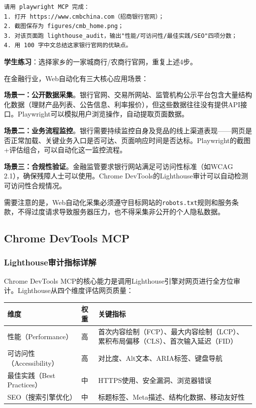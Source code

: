 \begin{lstlisting}
请用 playwright MCP 完成：
1. 打开 https://www.cmbchina.com（招商银行官网）；
2. 截图保存为 figures/cmb_home.png；
3. 对该页面跑 lighthouse_audit，输出"性能/可访问性/最佳实践/SEO"四项分数；
4. 用 100 字中文总结这家银行官网的优缺点。
\end{lstlisting}

\textbf{学生练习}：选择家乡的一家城商行/农商行官网，重复上述4步。

\begin{theorybox}[Web自动化在金融数据采集中的应用场景]
在金融行业，Web自动化有三大核心应用场景：

\textbf{场景一：公开数据采集}。银行官网、交易所网站、监管机构公示平台包含大量结构化数据（理财产品列表、公告信息、利率报价），但这些数据往往没有提供API接口。Playwright可以模拟用户浏览操作，自动提取页面数据。

\textbf{场景二：业务流程监控}。银行需要持续监控自身及竞品的线上渠道表现——网页是否正常加载、关键业务入口是否可达、页面响应时间是否达标。Playwright的截图+评估组合，可以自动化这一监控流程。

\textbf{场景三：合规性验证}。金融监管要求银行网站满足可访问性标准（如WCAG 2.1），确保残障人士可以使用。Chrome DevTools的Lighthouse审计可以自动检测可访问性合规情况。

需要注意的是，Web自动化采集必须遵守目标网站的\texttt{robots.txt}规则和服务条款，不得过度请求导致服务器压力，也不得采集非公开的个人隐私数据。
\end{theorybox}

\subsection{Chrome DevTools MCP}

\subsubsection{Lighthouse审计指标详解}

Chrome DevTools MCP的核心能力是调用Lighthouse引擎对网页进行全方位审计。Lighthouse从四个维度评估网页质量：

\begin{table}[H]
\centering
\begin{tabular}{lp{3cm}p{6cm}}
\toprule
\textbf{维度} & \textbf{权重} & \textbf{关键指标} \\
\midrule
性能（Performance） & 高 & 首次内容绘制（FCP）、最大内容绘制（LCP）、累积布局偏移（CLS）、首次输入延迟（FID） \\
可访问性（Accessibility） & 高 & 对比度、Alt文本、ARIA标签、键盘导航 \\
最佳实践（Best Practices） & 中 & HTTPS使用、安全漏洞、浏览器错误 \\
SEO（搜索引擎优化） & 中 & 标题标签、Meta描述、结构化数据、移动友好性 \\
\bottomrule
\end{tabular}
\end{table}

